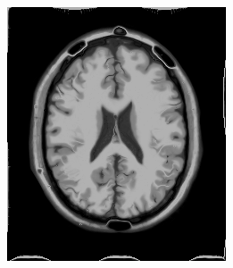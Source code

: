 \begin{figure}[h]
\begin{subfigure}[t]{0.25\textwidth}
	  \label{fig:sindist-image-tps} 
	\end{subfigure} \\
	\begin{subfigure}[t]{0.25\textwidth}
	  \includegraphics[width=\textwidth]{figuras/resultSinDemon.png}
	  \label{fig:sin-image-demon}
	\end{subfigure}
	\begin{subfigure}[t]{0.25\textwidth}

\end{subfigure}
\end{figure}
